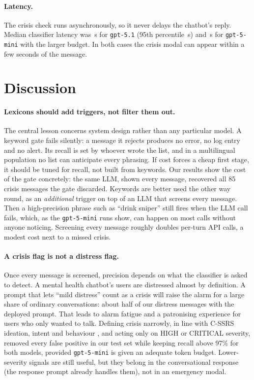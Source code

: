 \paragraph{Latency.} The crisis check runs asynchronously, so it never delays the chatbot's reply. Median classifier latency was \,s for \texttt{gpt-5.1} (95th percentile \,s) and \,s for \texttt{gpt-5-mini} with the larger budget. In both cases the crisis modal can appear within a few seconds of the message.

\section{Discussion}\label{sec:discussion}

\paragraph{Lexicons should add triggers, not filter them out.} The central lesson concerns system design rather than any particular model. A keyword gate fails silently: a message it rejects produces no error, no log entry and no alert. Its recall is set by whoever wrote the list, and in a multilingual population no list can anticipate every phrasing. If cost forces a cheap first stage, it should be tuned for recall, not built from keywords. Our results show the cost of the gate concretely: the same LLM, shown every message, recovered all 85 crisis messages the gate discarded. Keywords are better used the other way round, as an \emph{additional} trigger on top of an LLM that screens every message. Then a high-precision phrase such as ``drink sniper'' still fires when the LLM call fails, which, as the \texttt{gpt-5-mini} runs show, can happen on most calls without anyone noticing. Screening every message roughly doubles per-turn API calls, a modest cost next to a missed crisis.

\paragraph{A crisis flag is not a distress flag.} Once every message is screened, precision depends on what the classifier is asked to detect. A mental health chatbot's users are distressed almost by definition. A prompt that lets ``mild distress'' count as a crisis will raise the alarm for a large share of ordinary conversations: about half of our distress messages with the deployed prompt. That leads to alarm fatigue and a patronising experience for users who only wanted to talk. Defining crisis narrowly, in line with C-SSRS ideation, intent and behaviour \citep{posner2011cssrs}, and acting only on HIGH or CRITICAL severity, removed every false positive in our test set while keeping recall above 97\% for both models, provided \texttt{gpt-5-mini} is given an adequate token budget. Lower-severity signals are still useful, but they belong in the conversational response (the response prompt already handles them), not in an emergency modal.

